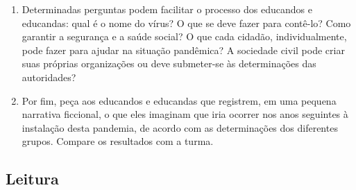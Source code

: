 \documentclass[12pt]{extarticle}
\begin{document}
\begin{enumerate}
\item Determinadas perguntas podem facilitar o processo dos educandos e
educandas: qual é o nome do vírus? O que se deve fazer para contê-lo?
Como garantir a segurança e a saúde social? O que cada cidadão,
individualmente, pode fazer para ajudar na situação pandêmica? A
sociedade civil pode criar suas próprias organizações ou deve
submeter-se às determinações das autoridades?

\item Por fim, peça aos educandos e educandas que registrem, em uma pequena
narrativa ficcional, o que eles imaginam que iria ocorrer nos anos
seguintes à instalação desta pandemia, de acordo com as determinações
dos diferentes grupos. Compare os resultados com a turma.
\end{enumerate}

\subsection{Leitura}


\end{document}
